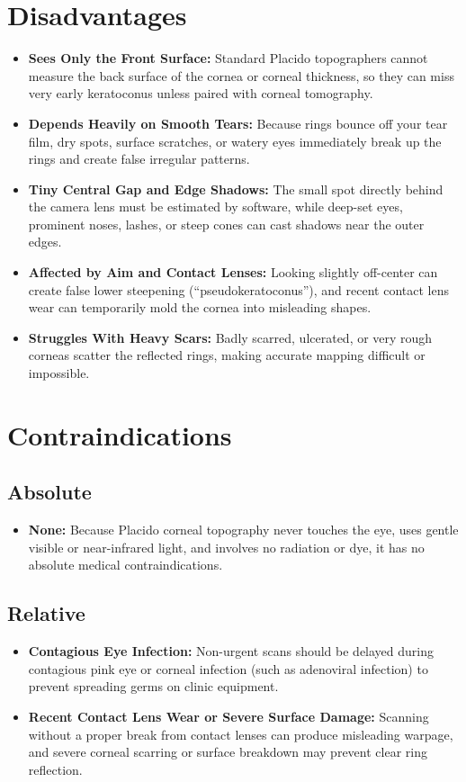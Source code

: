 \section{Disadvantages}
\begin{itemize}
    \item \textbf{Sees Only the Front Surface:} Standard Placido topographers cannot measure the back surface of the cornea or corneal thickness, so they can miss very early keratoconus unless paired with corneal tomography.
    \item \textbf{Depends Heavily on Smooth Tears:} Because rings bounce off your tear film, dry spots, surface scratches, or watery eyes immediately break up the rings and create false irregular patterns.
    \item \textbf{Tiny Central Gap and Edge Shadows:} The small spot directly behind the camera lens must be estimated by software, while deep-set eyes, prominent noses, lashes, or steep cones can cast shadows near the outer edges.
    \item \textbf{Affected by Aim and Contact Lenses:} Looking slightly off-center can create false lower steepening (``pseudokeratoconus''), and recent contact lens wear can temporarily mold the cornea into misleading shapes.
    \item \textbf{Struggles With Heavy Scars:} Badly scarred, ulcerated, or very rough corneas scatter the reflected rings, making accurate mapping difficult or impossible.
\end{itemize}

\section{Contraindications}

\subsection{Absolute}
\begin{itemize}
    \item \textbf{None:} Because Placido corneal topography never touches the eye, uses gentle visible or near-infrared light, and involves no radiation or dye, it has no absolute medical contraindications.
\end{itemize}

\subsection{Relative}
\begin{itemize}
    \item \textbf{Contagious Eye Infection:} Non-urgent scans should be delayed during contagious pink eye or corneal infection (such as adenoviral infection) to prevent spreading germs on clinic equipment.
    \item \textbf{Recent Contact Lens Wear or Severe Surface Damage:} Scanning without a proper break from contact lenses can produce misleading warpage, and severe corneal scarring or surface breakdown may prevent clear ring reflection.
\end{itemize}

